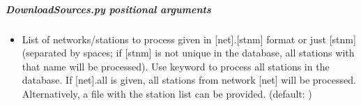 \documentclass[letterpaper,10pt,english]{sphinxmanual}
\begin{document}
\subparagraph{DownloadSources.py positional arguments}
\label{\detokenize{pgamit.com:DownloadSources.py-positional-arguments}}\begin{itemize}
\item {} 
\sphinxAtStartPar
{\hyperref[\detokenize{pgamit.com:DownloadSources.py-all|net.stnm}]{}} \sphinxhyphen{} List of networks/stations to process given in {[}net{]}.{[}stnm{]} format or just {[}stnm{]} (separated by spaces; if {[}stnm{]} is not unique in the database, all stations with that name will be processed). Use keyword  to process all stations in the database. If {[}net{]}.all is given, all stations from network {[}net{]} will be processed. Alternatively, a file with the station list can be provided. (default: )

\end{itemize}
\end{document}
